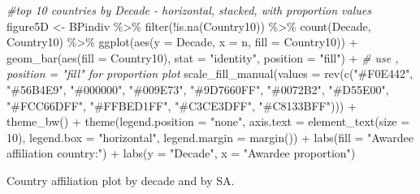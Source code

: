 \documentclass[
]{article}
\newenvironment{Shaded}{\begin{snugshade}}{\end{snugshade}}
\newcommand{\AttributeTok}[1]{\textcolor[rgb]{0.77,0.63,0.00}{#1}}
\newcommand{\CommentTok}[1]{\textcolor[rgb]{0.56,0.35,0.01}{\textit{#1}}}
\newcommand{\DecValTok}[1]{\textcolor[rgb]{0.00,0.00,0.81}{#1}}
\newcommand{\FunctionTok}[1]{\textcolor[rgb]{0.00,0.00,0.00}{#1}}
\newcommand{\NormalTok}[1]{#1}
\newcommand{\OtherTok}[1]{\textcolor[rgb]{0.56,0.35,0.01}{#1}}
\newcommand{\SpecialCharTok}[1]{\textcolor[rgb]{0.00,0.00,0.00}{#1}}
\newcommand{\StringTok}[1]{\textcolor[rgb]{0.31,0.60,0.02}{#1}}
\begin{document}
\begin{Shaded}
\begin{Highlighting}[]
\CommentTok{\#top 10 countries by Decade {-} horizontal, stacked, with proportion values}
\NormalTok{figure5D }\OtherTok{\textless{}{-}}\NormalTok{ BPindiv }\SpecialCharTok{\%\textgreater{}\%} 
  \FunctionTok{filter}\NormalTok{(}\SpecialCharTok{!}\FunctionTok{is.na}\NormalTok{(Country10)) }\SpecialCharTok{\%\textgreater{}\%} 
  \FunctionTok{count}\NormalTok{(Decade, Country10) }\SpecialCharTok{\%\textgreater{}\%} 
  \FunctionTok{ggplot}\NormalTok{(}\FunctionTok{aes}\NormalTok{(}\AttributeTok{y =}\NormalTok{ Decade, }\AttributeTok{x =}\NormalTok{ n, }\AttributeTok{fill =}\NormalTok{ Country10)) }\SpecialCharTok{+}
  \FunctionTok{geom\_bar}\NormalTok{(}\FunctionTok{aes}\NormalTok{(}\AttributeTok{fill =}\NormalTok{ Country10), }\AttributeTok{stat =} \StringTok{"identity"}\NormalTok{, }\AttributeTok{position =} \StringTok{"fill"}\NormalTok{) }\SpecialCharTok{+} \CommentTok{\# use , position = "fill" for proportion plot}
  \FunctionTok{scale\_fill\_manual}\NormalTok{(}\AttributeTok{values =} \FunctionTok{rev}\NormalTok{(}\FunctionTok{c}\NormalTok{(}\StringTok{"\#F0E442"}\NormalTok{, }\StringTok{"\#56B4E9"}\NormalTok{, }\StringTok{"\#000000"}\NormalTok{, }\StringTok{"\#009E73"}\NormalTok{, }\StringTok{"\#9D7660FF"}\NormalTok{, }\StringTok{"\#0072B2"}\NormalTok{, }\StringTok{"\#D55E00"}\NormalTok{, }\StringTok{"\#FCC66DFF"}\NormalTok{, }\StringTok{"\#FFBED1FF"}\NormalTok{, }\StringTok{"\#C3CE3DFF"}\NormalTok{, }\StringTok{"\#C8133BFF"}\NormalTok{))) }\SpecialCharTok{+}
  \FunctionTok{theme\_bw}\NormalTok{() }\SpecialCharTok{+}
  \FunctionTok{theme}\NormalTok{(}\AttributeTok{legend.position =} \StringTok{"none"}\NormalTok{, }\AttributeTok{axis.text =} \FunctionTok{element\_text}\NormalTok{(}\AttributeTok{size =} \DecValTok{10}\NormalTok{), }\AttributeTok{legend.box =} \StringTok{"horizontal"}\NormalTok{, }\AttributeTok{legend.margin =} \FunctionTok{margin}\NormalTok{()) }\SpecialCharTok{+}
  \FunctionTok{labs}\NormalTok{(}\AttributeTok{fill =} \StringTok{"Awardee affiliation country:"}\NormalTok{) }\SpecialCharTok{+}
  \FunctionTok{labs}\NormalTok{(}\AttributeTok{y =} \StringTok{"Decade"}\NormalTok{, }\AttributeTok{x =} \StringTok{"Awardee proportion"}\NormalTok{)  }
\end{Highlighting}
\end{Shaded}

Country affiliation plot by decade and by SA.
\end{document}
